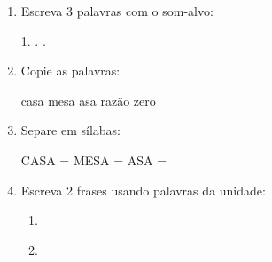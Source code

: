 \begin{exercicio}
\begin{enumerate}[resume]
  \item Escreva 3 palavras com o som-alvo:
  \begin{center}
  1. \underline{\hspace{3cm}} . \underline{\hspace{3cm}} . \underline{\hspace{3cm}}
  \end{center}

  \item Copie as palavras:
  \begin{center}
  casa \quad mesa \quad asa \quad razão \quad zero
  \end{center}

  \item Separe em sílabas:
  \begin{center}
  CASA = \underline{\hspace{1cm}} \underline{\hspace{1cm}} \quad MESA = \underline{\hspace{1cm}} \underline{\hspace{1cm}} \quad ASA = \underline{\hspace{1cm}} \underline{\hspace{1cm}}
  \end{center}

  \item Escreva 2 frases usando palavras da unidade:
  \begin{enumerate}[label=\alph*)]
    \item \underline{\hspace{8cm}}
    \item \underline{\hspace{8cm}}
  \end{enumerate}

\end{enumerate}

\end{exercicio}



